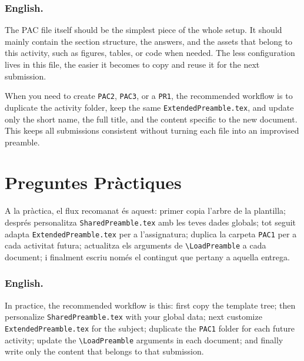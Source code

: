 			\subsubsection*{English.}
 			The PAC file itself should be the simplest piece of the whole setup. It should mainly contain the section structure, the answers, and the assets that belong to this activity, such as figures, tables, or code when needed. The less configuration lives in this file, the easier it becomes to copy and reuse it for the next submission.

			When you need to create \texttt{PAC2}, \texttt{PAC3}, or a \texttt{PR1}, the recommended workflow is to duplicate the activity folder, keep the same \texttt{ExtendedPreamble.tex}, and update only the short name, the full title, and the content specific to the new document. This keeps all submissions consistent without turning each file into an improvised preamble.

	\newpage
	\section[Part 2]{Preguntes Pràctiques}

	A la pràctica, el flux recomanat és aquest: primer copia l'arbre de la plantilla; després personalitza \texttt{SharedPreamble.tex} amb les teves dades globals; tot seguit adapta \texttt{ExtendedPreamble.tex} per a l'assignatura; duplica la carpeta \texttt{PAC1} per a cada activitat futura; actualitza els arguments de \verb|\LoadPreamble| a cada document; i finalment escriu només el contingut que pertany a aquella entrega.

	\subsubsection*{English.}
	In practice, the recommended workflow is this: first copy the template tree; then personalize \texttt{SharedPreamble.tex} with your global data; next customize \texttt{ExtendedPreamble.tex} for the subject; duplicate the \texttt{PAC1} folder for each future activity; update the \verb|\LoadPreamble| arguments in each document; and finally write only the content that belongs to that submission.


